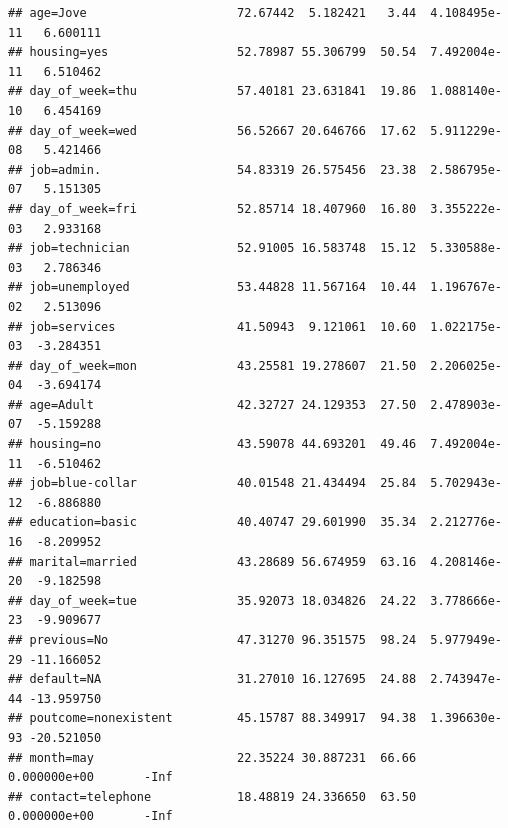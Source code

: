 \documentclass[
]{article}
\newenvironment{Shaded}{\begin{snugshade}}{\end{snugshade}}
\newcommand{\CommentTok}[1]{\textcolor[rgb]{0.56,0.35,0.01}{\textit{#1}}}
\newcommand{\NormalTok}[1]{#1}
\newcommand{\SpecialCharTok}[1]{\textcolor[rgb]{0.00,0.00,0.00}{#1}}
\begin{document}
\begin{verbatim}
## age=Jove                     72.67442  5.182421   3.44  4.108495e-11   6.600111
## housing=yes                  52.78987 55.306799  50.54  7.492004e-11   6.510462
## day_of_week=thu              57.40181 23.631841  19.86  1.088140e-10   6.454169
## day_of_week=wed              56.52667 20.646766  17.62  5.911229e-08   5.421466
## job=admin.                   54.83319 26.575456  23.38  2.586795e-07   5.151305
## day_of_week=fri              52.85714 18.407960  16.80  3.355222e-03   2.933168
## job=technician               52.91005 16.583748  15.12  5.330588e-03   2.786346
## job=unemployed               53.44828 11.567164  10.44  1.196767e-02   2.513096
## job=services                 41.50943  9.121061  10.60  1.022175e-03  -3.284351
## day_of_week=mon              43.25581 19.278607  21.50  2.206025e-04  -3.694174
## age=Adult                    42.32727 24.129353  27.50  2.478903e-07  -5.159288
## housing=no                   43.59078 44.693201  49.46  7.492004e-11  -6.510462
## job=blue-collar              40.01548 21.434494  25.84  5.702943e-12  -6.886880
## education=basic              40.40747 29.601990  35.34  2.212776e-16  -8.209952
## marital=married              43.28689 56.674959  63.16  4.208146e-20  -9.182598
## day_of_week=tue              35.92073 18.034826  24.22  3.778666e-23  -9.909677
## previous=No                  47.31270 96.351575  98.24  5.977949e-29 -11.166052
## default=NA                   31.27010 16.127695  24.88  2.743947e-44 -13.959750
## poutcome=nonexistent         45.15787 88.349917  94.38  1.396630e-93 -20.521050
## month=may                    22.35224 30.887231  66.66  0.000000e+00       -Inf
## contact=telephone            18.48819 24.336650  63.50  0.000000e+00       -Inf
\end{verbatim}

\begin{Shaded}
\end{Shaded}
\end{document}
